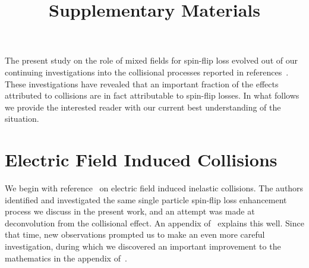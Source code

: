 \documentclass[%
 reprint,
 amsmath,amssymb,
 aps,
pra,
]{revtex4-1}
\begin{document}

\title{Supplementary Materials}%
\maketitle

The present study on the role of mixed fields for spin-flip loss evolved out of our continuing investigations into the collisional processes reported in references~\cite{Stuhl2013,Stuhl2012evap}.
These investigations have revealed that an important fraction of the effects attributed to collisions are in fact attributable to spin-flip losses.
In what follows we provide the interested reader with our current best understanding of the situation.

\section{Electric Field Induced Collisions}
We begin with reference~\cite{Stuhl2013} on electric field induced inelastic collisions. 
The authors identified and investigated the same single particle spin-flip loss enhancement process we discuss in the present work, and an attempt was made at deconvolution from the collisional effect. 
An appendix of~\cite{Stuhl2013} explains this well.
Since that time, new observations prompted us to make an even more careful investigation, during which we discovered an important improvement to the mathematics in the appendix of~\cite{Stuhl2013}.
\end{document}

